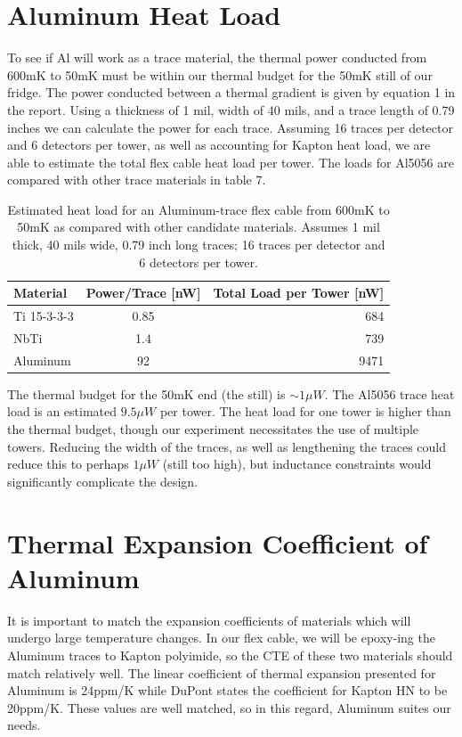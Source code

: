 \documentclass{report}
\begin{document}
\begin{appendices}
\section{Aluminum Heat Load}

To see if Al will work as a trace material, the thermal power conducted from 600mK to 50mK must be within our thermal budget for the 50mK still of our fridge. The power conducted between a thermal gradient is given by equation 1 in the report. Using a thickness of 1 mil, width of 40 mils, and a trace length of 0.79 inches we can calculate the power for each trace. Assuming 16 traces per detector and 6 detectors per tower, as well as accounting for Kapton heat load, we are able to estimate the total flex cable heat load per tower. The loads for Al5056 are compared with other trace materials in table 7.


\begin{table}
\begin{threeparttable}
\begin{tabular}{l|c|r}
\toprule
Material & Power/Trace [nW] & Total Load per Tower [nW] \\
\midrule
Ti 15-3-3-3 & 0.85 & 684 \\
NbTi & 1.4 & 739 \\
Aluminum & 92 & 9471 \\
\bottomrule
\end{tabular}
\end{threeparttable}
\caption{Estimated heat load for an Aluminum-trace flex cable from 600mK to 50mK as compared with other candidate materials. Assumes 1 mil thick, 40 mils wide, 0.79 inch long traces; 16 traces per detector and 6 detectors per tower.}
\end{table}

The thermal budget for the 50mK end (the still) is $\sim 1 \mu W$. The Al5056 trace heat load is an estimated $9.5 \mu W$ per tower. The heat load for one tower is higher than the thermal budget, though our experiment necessitates the use of multiple towers. Reducing the width of the traces, as well as lengthening the traces could reduce this to perhaps $1\mu W$ (still too high), but inductance constraints would significantly complicate the design.


\section{Thermal Expansion Coefficient of Aluminum}
It is important to match the expansion coefficients of materials which will undergo large temperature changes. In our flex cable, we will be epoxy-ing the Aluminum traces to Kapton polyimide, so the CTE of these two materials should match relatively well. The linear coefficient of thermal expansion presented for Aluminum is 24ppm/K while DuPont states the coefficient for Kapton HN to be 20ppm/K. These values are well matched, so in this regard, Aluminum suites our needs.


\end{appendices}
\end{document}
